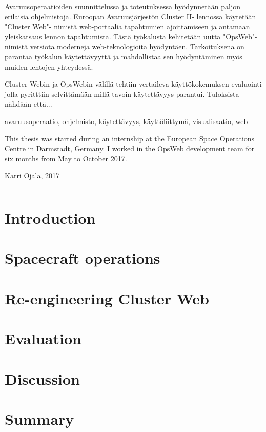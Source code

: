 \documentclass[a4paper, 12pt,titlepage]{dithesis}
\begin{document}
\begin{tiivistelma}
Avaruusoperaatioiden suunnittelussa ja toteutuksessa hyödynnetään paljon erilaisia ohjelmistoja. Euroopan Avaruusjärjestön Cluster II- lennossa käytetään "Cluster Web"- nimistä web-portaalia tapahtumien ajoittamiseen ja antamaan yleiskatsaus lennon tapahtumista. Tästä työkalusta kehitetään uutta "OpsWeb"- nimistä versiota moderneja web-teknologioita hyödyntäen. Tarkoituksena on parantaa työkalun käytettävyyttä ja mahdollistaa sen hyödyntäminen myös muiden lentojen yhteydessä.

Cluster Webin ja OpsWebin välillä tehtiin vertaileva käyttökokemuksen evaluointi jolla pyritttiin selvittämään millä tavoin käytettävyys parantui. Tuloksista nähdään että...

\avainsanat avaruusoperaatio, ohjelmisto, käytettävyys, käyttöliittymä, visualisaatio, web
\end{tiivistelma}


\sisluettelo

This thesis was started during an internship at the European Space Operations Centre in Darmstadt, Germany. I worked in the OpsWeb development team for six months from May to October 2017.

Karri Ojala, 2017


\setlongtables
\begin{longtable}[l]{p{3cm}p{}}



\end{longtable}
\setcounter{table}{0}

\chapter{Introduction}
\sivunumerot

\chapter{Spacecraft operations}

\chapter{Re-engineering Cluster Web}\label{cluweb_chapter}

\chapter{Evaluation}

\chapter{Discussion}

\chapter{Summary}



\end{document}
